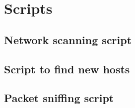 \chapter{Scripts}
\section{Network scanning script}

\section{Script to find new hosts}

\section{Packet sniffing script}
